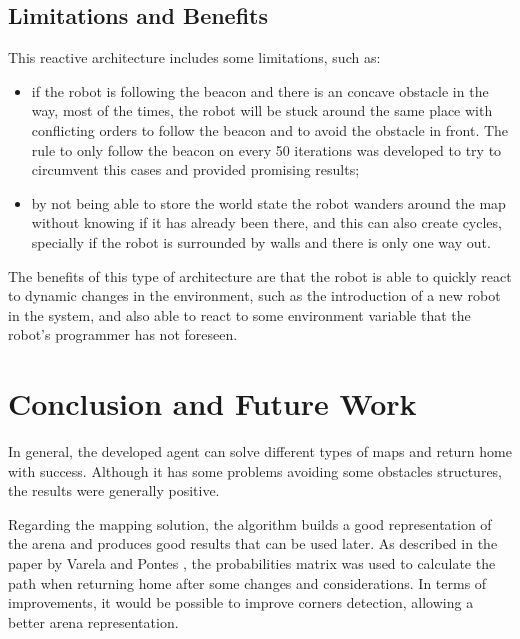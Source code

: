 \documentclass[oribibl]{llncs}
\begin{document}
\subsection{Limitations and Benefits}
This reactive architecture includes some limitations, such as:

\begin{itemize}
  \item if the robot is following the beacon and there is an concave obstacle in the way, most of the times, the robot will be stuck around the same place with conflicting orders to follow the beacon and to avoid the obstacle in front. The rule to only follow the beacon on every 50 iterations was developed to try to circumvent this cases and provided promising results;
  \item by not being able to store the world state the robot wanders around the map without knowing if it has already been there, and this can also create cycles, specially if the robot is surrounded by walls and there is only one way out.
\end{itemize}

The benefits of this type of architecture are that the robot is able to quickly react to dynamic changes in the environment, such as the introduction of a new robot in the system, and also able to react to some environment variable that the robot's programmer has not foreseen.

\section{Conclusion and Future Work}

In general, the developed agent can solve different types of maps and return home with success. Although it has some problems avoiding some obstacles structures, the results were generally positive.

Regarding the mapping solution, the algorithm builds a good representation of the arena and produces good results that can be used later. As described in the paper by  Varela and Pontes \cite{varelaepontes}, the probabilities matrix was used to calculate the path when returning home after some changes and considerations. In terms of improvements, it would be possible to improve corners detection, allowing a better arena representation.



\end{document}
